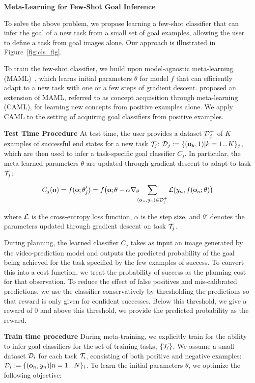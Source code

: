 \textbf{Meta-Learning for Few-Shot Goal Inference}

To solve the above problem, we propose learning a few-shot classifier that can infer the goal of a new task from a small set of goal examples, allowing the user to define a task from goal images alone. Our approach is illustrated in Figure~\ref{fig:cls_fig}.

To train the few-shot classifier, we build upon model-agnostic meta-learning (MAML)~\cite{maml}, which learns initial parameters $\theta$ for model $f$ that can efficiently adapt to a new task with one or a few steps of gradient descent. \cite{caml} proposed an extension of MAML, referred to as concept acquisition through meta-learning (CAML), for learning new concepts from positive examples alone. We apply CAML to the setting of acquiring goal classifiers from positive examples.

\textbf{Test Time Procedure}
At test time, the user provides a dataset $\mathcal{D}^+_j$ of $K$ examples of successful end states for a new task $\mathcal{T}_j$: $\mathcal{D}_j:=\{(\mathbf{o}_k, 1) | k = 1...K\}_j$, which are then used to infer a task-specific goal classifier $C_j$. In particular, the meta-learned parameters $\theta$ are updated through gradient descent to adapt to task $\mathcal{T}_j$:

$$
C_j(\mathbf{o})
= f(\mathbf{o}; \theta_j')
= f\big(\mathbf{o}; \theta-\alpha \nabla_\theta \!\!\! \sum_{(\mathbf{o}_n, y_n)\in \mathcal{D}^+_j} \mathcal{L} (y_n, f(\mathbf{o}_n; \theta)\big)
$$

where $\mathcal{L}$ is the cross-entropy loss function, $\alpha$ is the step size, and $\theta'$ denotes the parameters updated through gradient descent on task $\mathcal{T}_j$.

During planning, the learned classifier $C_j$ takes as input an image generated by the video-prediction model and outputs the predicted probability of the goal being achieved for the task specified by the few examples of success. To convert this into a cost function, we treat the probability of success as the planning cost for that observation. To reduce the effect of false positives and mis-calibrated predictions, we use the classifier conservatively by thresholding the predictions so that reward is only given for confident successes. Below this threshold, we give a reward of 0 and above this threshold, we provide the predicted probability as the reward. %


\textbf{Train time procedure}
During meta-training, we explicitly train for the ability to infer goal classifiers for the set of training tasks, $\{ \mathcal{T}_i \}$. We assume a small dataset $\mathcal{D}_i$ for each task $\mathcal{T}_i$, consisting of both positive and negative examples: $\mathcal{D}_i:= \{(\mathbf{o}_n,y_n) | n=1...N \}_i$. To learn the initial parameters $\theta$, we optimize the following objective:

